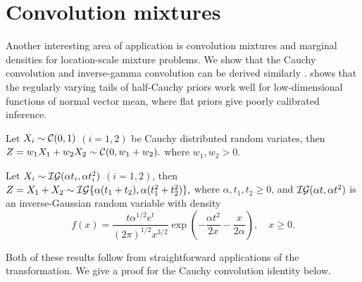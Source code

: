 \documentclass[lineno]{biometrika}
\begin{document}

\section{Convolution mixtures}
\label{sec:convolutions}

Another interesting area of application is convolution mixtures and marginal densities for location-scale mixture problems. We show that the Cauchy
convolution \citep{pillai2015unexpected} and inverse-gamma convolution can be derived similarly \citep{polson_halfcauchy_2012}. \citet{bhadra_default_2016} shows that the regularly varying tails of half-Cauchy priors work well for low-dimensional functions of normal
vector mean, where flat priors give poorly calibrated inference. 
\begin{lemma}
  Let $X_i \sim \mathcal{C}(0,1)$ $(i = 1, 2)$ be Cauchy distributed random variates, then $Z = w_1 X_1 + w_2 X_2 \sim \mathcal{C}( 0, w_1 + w_2).$ where $w_1,w_2 > 0$.
\end{lemma}
\begin{lemma}
  Let $X_i \sim \mathcal{IG}(\alpha t_i, \alpha t_i^2)$ $(i = 1, 2)$, then $Z = X_1 + X_2 \sim \mathcal{IG}\{\alpha (t_1 + t_2), \alpha (t_1^2+t_2^2)\},$ where $\alpha, t_1, t_2 \geq 0$, and $\mathcal{IG}(\alpha t, \alpha t^2)$ is an inverse-Gaussian random variable with density
\[
    f(x) = \frac{t \alpha^{1/2} e^t}{(2 \pi)^{1/2} x^{3/2}} 
    \exp\left( -\frac{\alpha t^2}{2x} - \frac{x}{2\alpha} \right), \quad x \geq 0.
\]
\end{lemma}

Both of these results follow from straightforward applications of the \CS{} 
transformation. We give a proof for the Cauchy convolution identity below.
\end{document}
